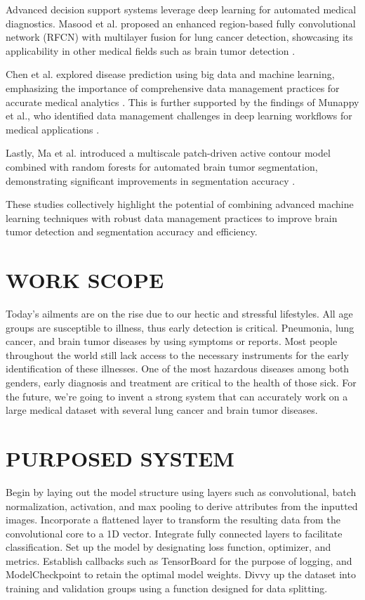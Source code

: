 \documentclass[conference]{IEEEtran}
\begin{document}
Advanced decision support systems leverage deep learning for automated medical diagnostics. 
Masood et al. proposed an enhanced region-based fully convolutional network (RFCN) with multilayer fusion for lung cancer detection, showcasing its applicability in other medical fields such as brain tumor detection \cite{masood900}. 

Chen et al. explored disease prediction using big data and machine learning, emphasizing the importance of comprehensive data management practices for accurate medical analytics \cite{chen791-53}. 
This is further supported by the findings of Munappy et al., who identified data management challenges in deep learning workflows for medical applications \cite{munppy89-16}.

Lastly, Ma et al. introduced a multiscale patch-driven active contour model combined with random forests for automated brain tumor segmentation, demonstrating significant improvements in segmentation accuracy \cite{ma82}.

These studies collectively highlight the potential of combining advanced machine learning techniques with robust data management practices to improve brain tumor detection and segmentation accuracy and efficiency.

\section{WORK SCOPE}

 Today's ailments are on the rise due to our hectic and stressful lifestyles. All age groups are susceptible to illness, 
 thus early detection is critical. Pneumonia, lung cancer, and brain tumor diseases by using symptoms or reports. 
 Most people throughout the world still lack access to the necessary instruments for the early identification of these illnesses. 
 One of the most hazardous diseases among both genders, early diagnosis and treatment are critical to the health of those sick. 
 For the future, we're going to invent a strong system that can accurately work on a large medical dataset with several lung cancer and brain tumor diseases.
 

\section{ PURPOSED SYSTEM}

Begin by laying out the model structure using layers such as convolutional, batch normalization, activation, and max pooling to derive attributes from the inputted images. 
Incorporate a flattened layer to transform the resulting data from the convolutional core to a 1D vector.
Integrate fully connected layers to facilitate classification. Set up the model by designating loss function, optimizer, and metrics.
Establish callbacks such as TensorBoard for the purpose of logging, and ModelCheckpoint to retain the optimal model weights. 
Divvy up the dataset into training and validation groups using a function designed for data splitting. 
\end{document}
